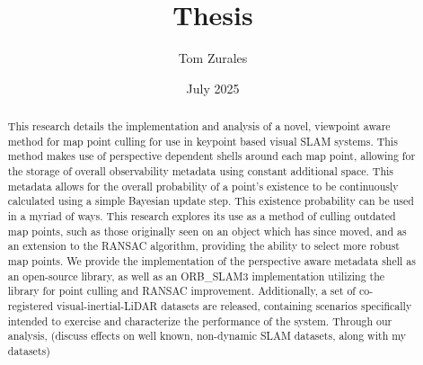 \documentclass[12pt]{article}
\title{Thesis}
\author{Tom Zurales}
\date{July 2025}
\begin{document}
\doublespace

\maketitle

\newpage

\begin{abstract}
    This research details the implementation and analysis of a novel, viewpoint aware method for map point culling for use in keypoint based visual SLAM systems. This method makes use of perspective dependent shells around each map point, allowing for the storage of overall observability metadata using constant additional space. This metadata allows for the overall probability of a point's existence to be continuously calculated using a simple Bayesian update step. This existence probability can be used in a myriad of ways. This research explores its use as a method of culling outdated map points, such as those originally seen on an object which has since moved, and as an extension to the RANSAC algorithm, providing the ability to select more robust map points. We provide the implementation of the perspective aware metadata shell as an open-source library, as well as an ORB\_SLAM3 implementation utilizing the library for point culling and RANSAC improvement. Additionally, a set of co-registered visual-inertial-LiDAR datasets are released, containing scenarios specifically intended to exercise and characterize the performance of the system. Through our analysis, (discuss effects on well known, non-dynamic SLAM datasets, along with my datasets)
\end{abstract}

\newpage

\tableofcontents

\newpage

\listoffigures















\printbibliography


\end{document}
